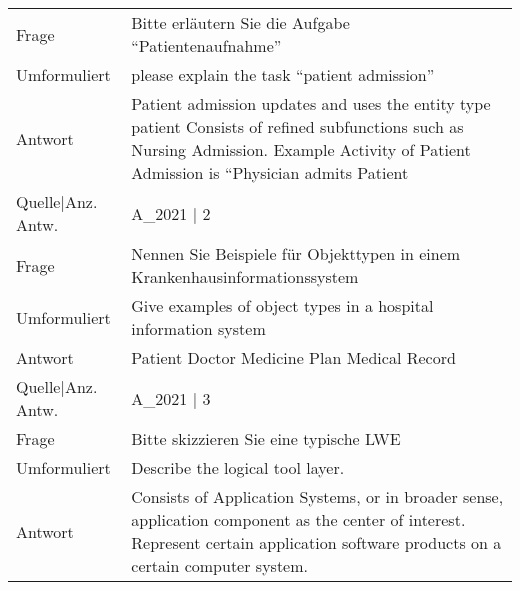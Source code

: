 {\begin{landscape}
\begin{longtable}{p{3cm}p{}}
    \midrule
    Frage & Bitte erläutern Sie die Aufgabe ``Patientenaufnahme'' \\
    Umformuliert & please explain the task ``patient admission'' \\
    Antwort & Patient admission updates and uses the entity type patient
    Consists of refined subfunctions such as Nursing Admission.
    Example Activity of Patient Admission is ``Physician admits Patient \\
    Quelle|Anz. Antw. &  A\_2021  | 2 \\
    \midrule
    Frage & Nennen Sie Beispiele für Objekttypen in einem Krankenhausinformationssystem \\
    Umformuliert & Give examples of object types in a hospital information system \\
    Antwort & Patient
    Doctor
    Medicine Plan
    Medical Record \\
    Quelle|Anz. Antw. &  A\_2021  | 3 \\
    \midrule
    Frage & Bitte skizzieren Sie eine typische LWE \\
    Umformuliert & Describe the logical tool layer.\\
    Antwort & Consists of Application Systems, or in broader sense, application component as the center of interest.
    Represent certain application software products on a certain computer system.


\end{longtable}
\end{landscape}}
